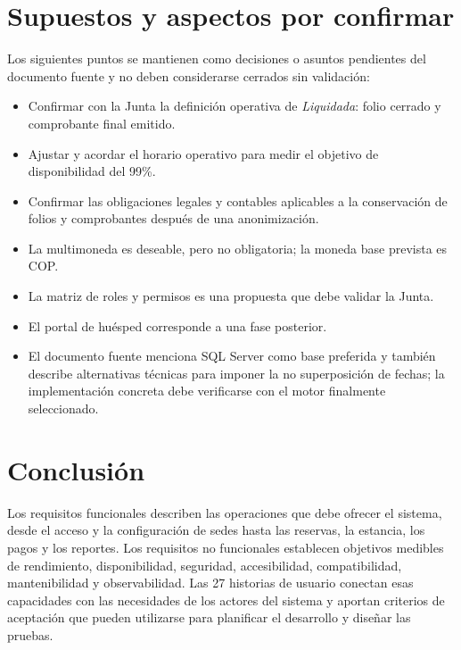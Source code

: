 \documentclass[12pt,a4paper]{article}
\begin{document}
\section{Supuestos y aspectos por confirmar}

Los siguientes puntos se mantienen como decisiones o asuntos pendientes del documento fuente y no deben considerarse cerrados sin validación:
\begin{itemize}
  \item Confirmar con la Junta la definición operativa de \textit{Liquidada}: folio cerrado y comprobante final emitido.
  \item Ajustar y acordar el horario operativo para medir el objetivo de disponibilidad del 99\%.
  \item Confirmar las obligaciones legales y contables aplicables a la conservación de folios y comprobantes después de una anonimización.
  \item La multimoneda es deseable, pero no obligatoria; la moneda base prevista es COP.
  \item La matriz de roles y permisos es una propuesta que debe validar la Junta.
  \item El portal de huésped corresponde a una fase posterior.
  \item El documento fuente menciona SQL Server como base preferida y también describe alternativas técnicas para imponer la no superposición de fechas; la implementación concreta debe verificarse con el motor finalmente seleccionado.
\end{itemize}

\section{Conclusión}

Los requisitos funcionales describen las operaciones que debe ofrecer el sistema, desde el acceso y la configuración de sedes hasta las reservas, la estancia, los pagos y los reportes. Los requisitos no funcionales establecen objetivos medibles de rendimiento, disponibilidad, seguridad, accesibilidad, compatibilidad, mantenibilidad y observabilidad. Las 27 historias de usuario conectan esas capacidades con las necesidades de los actores del sistema y aportan criterios de aceptación que pueden utilizarse para planificar el desarrollo y diseñar las pruebas.
\end{document}
